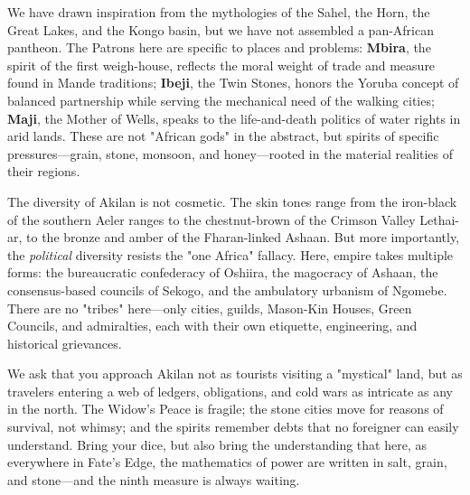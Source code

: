\documentclass[11pt]{book}
\begin{document}
We have drawn inspiration from the mythologies of the Sahel, the Horn, the Great Lakes, and the Kongo basin, but we have not assembled a pan-African pantheon. The Patrons here are specific to places and problems: \textbf{Mbira}, the spirit of the first weigh-house, reflects the moral weight of trade and measure found in Mande traditions; \textbf{Ibeji}, the Twin Stones, honors the Yoruba concept of balanced partnership while serving the mechanical need of the walking cities; \textbf{Maji}, the Mother of Wells, speaks to the life-and-death politics of water rights in arid lands. These are not "African gods" in the abstract, but spirits of specific pressures---grain, stone, monsoon, and honey---rooted in the material realities of their regions.

The diversity of Akilan is not cosmetic. The skin tones range from the iron-black of the southern Aeler ranges to the chestnut-brown of the Crimson Valley Lethai-ar, to the bronze and amber of the Fharan-linked Ashaan. But more importantly, the \textit{political} diversity resists the "one Africa" fallacy. Here, empire takes multiple forms: the bureaucratic confederacy of Oshiira, the magocracy of Ashaan, the consensus-based councils of Sekogo, and the ambulatory urbanism of Ngomebe. There are no "tribes" here---only cities, guilds, Mason-Kin Houses, Green Councils, and admiralties, each with their own etiquette, engineering, and historical grievances.

We ask that you approach Akilan not as tourists visiting a "mystical" land, but as travelers entering a web of ledgers, obligations, and cold wars as intricate as any in the north. The Widow's Peace is fragile; the stone cities move for reasons of survival, not whimsy; and the spirits remember debts that no foreigner can easily understand. Bring your dice, but also bring the understanding that here, as everywhere in Fate's Edge, the mathematics of power are written in salt, grain, and stone---and the ninth measure is always waiting.
\end{document}
